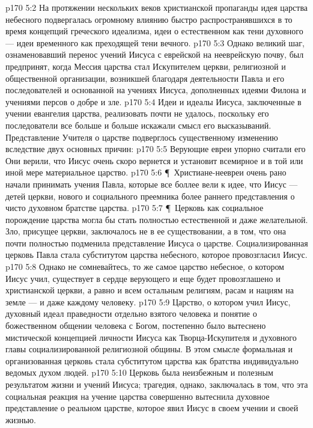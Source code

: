 \vs p170 5:2 На протяжении нескольких веков христианской пропаганды идея царства небесного подвергалась огромному влиянию быстро распространявшихся в то время концепций греческого идеализма, идеи о естественном как тени духовного --- идеи временного как преходящей тени вечного.
\vs p170 5:3 Однако великий шаг, ознаменовавший перенос учений Иисуса с еврейской на нееврейскую почву, был предпринят, когда Мессия царства стал Искупителем церкви, религиозной и общественной организации, возникшей благодаря деятельности Павла и его последователей и основанной на учениях Иисуса, дополненных идеями Филона и учениями персов о добре и зле.
\vs p170 5:4 Идеи и идеалы Иисуса, заключенные в учении евангелия царства, реализовать почти не удалось, поскольку его последователи все больше и больше искажали смысл его высказываний. Представление Учителя о царстве подверглось существенному изменению вследствие двух основных причин:
\vs p170 5:5 \bibnobreakspace Верующие евреи упорно считали его  Они верили, что Иисус очень скоро вернется и установит всемирное и в той или иной мере материальное царство.
\vs p170 5:6 \P\ \bibnobreakspace Христиане\hyp{}неевреи очень рано начали принимать учения Павла, которые все боллее вели к идее, что Иисус ---  детей церкви, нового и социального преемника более раннего представления о чисто духовном братстве царства.
\vs p170 5:7 \P\ Церковь как социальное порождение царства могла бы стать полностью естественной и даже желательной. Зло, присущее церкви, заключалось не в ее существовании, а в том, что она почти полностью подменила представление Иисуса о царстве. Социализированная церковь Павла стала субститутом царства небесного, которое провозгласил Иисус.
\vs p170 5:8 Однако не сомневайтесь, то же самое царство небесное, о котором Иисус учил, существует в сердце верующего и еще будет провозглашено и христианской церкви, а равно и всем остальным религиям, расам и нациям на земле --- и даже каждому человеку.
\vs p170 5:9 Царство, о котором учил Иисус, духовный идеал праведности отдельно взятого человека и понятие о божественном общении человека с Богом, постепенно было вытеснено мистической концепцией личности Иисуса как Творца\hyp{}Искупителя и духовного главы социализированной религиозной общины. В этом смысле формальная и организованная церковь стала субститутом царства как братства индивидуально ведомых духом людей.
\vs p170 5:10 Церковь была неизбежным и полезным  результатом жизни и учений Иисуса; трагедия, однако, заключалась в том, что эта социальная реакция на учение царства совершенно вытеснила духовное представление о реальном царстве, которое явил Иисус в своем учении и своей жизнью.
